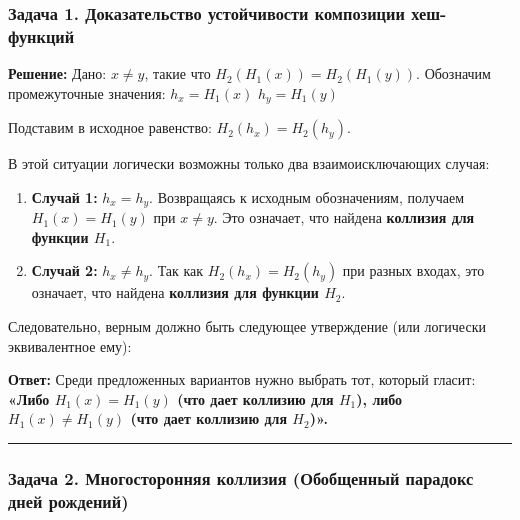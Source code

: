 ﻿\documentclass[9pt,a4paper]{extarticle}
\newcommand{\tightlist}{}
\begin{document}
\subsubsection{Задача 1. Доказательство устойчивости композиции хеш-функций}\label{ux437ux430ux434ux430ux447ux430-1.-ux434ux43eux43aux430ux437ux430ux442ux435ux43bux44cux441ux442ux432ux43e-ux443ux441ux442ux43eux439ux447ux438ux432ux43eux441ux442ux438-ux43aux43eux43cux43fux43eux437ux438ux446ux438ux438-ux445ux435ux448-ux444ux443ux43dux43aux446ux438ux439}

\textbf{Решение:} Дано: \(x \neq y\), такие что \(H_2(H_1(x)) = H_2(H_1(y))\). Обозначим промежуточные значения: \(h_x = H_1(x)\) \(h_y = H_1(y)\)

Подставим в исходное равенство: \(H_2(h_x) = H_2(h_y)\).

В этой ситуации логически возможны только два взаимоисключающих случая:

\begin{enumerate}
\def\labelenumi{\arabic{enumi}.}
\tightlist
\item
  \textbf{Случай 1:} \(h_x = h_y\). Возвращаясь к исходным обозначениям, получаем \(H_1(x) = H_1(y)\) при \(x \neq y\). Это означает, что найдена \textbf{коллизия для функции \(H_1\)}.
\item
  \textbf{Случай 2:} \(h_x \neq h_y\). Так как \(H_2(h_x) = H_2(h_y)\) при разных входах, это означает, что найдена \textbf{коллизия для функции \(H_2\)}.
\end{enumerate}

Следовательно, верным должно быть следующее утверждение (или логически эквивалентное ему):

\textbf{Ответ:} Среди предложенных вариантов нужно выбрать тот, который гласит: \textbf{«Либо \(H_1(x) = H_1(y)\) (что дает коллизию для \(H_1\)), либо \(H_1(x) \neq H_1(y)\) (что дает коллизию для \(H_2\))».}

\begin{center}\rule{0.5\linewidth}{0.5pt}\end{center}

\subsubsection{Задача 2. Многосторонняя коллизия (Обобщенный парадокс дней рождений)}\label{ux437ux430ux434ux430ux447ux430-2.-ux43cux43dux43eux433ux43eux441ux442ux43eux440ux43eux43dux43dux44fux44f-ux43aux43eux43bux43bux438ux437ux438ux44f-ux43eux431ux43eux431ux449ux435ux43dux43dux44bux439-ux43fux430ux440ux430ux434ux43eux43aux441-ux434ux43dux435ux439-ux440ux43eux436ux434ux435ux43dux438ux439}
\end{document}
